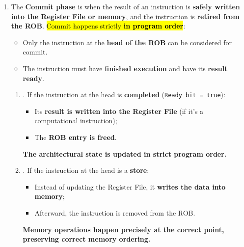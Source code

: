 \begin{enumerate}
    \newpage

    \item {}
    
    The \textbf{Commit phase} is when the result of an instruction is \textbf{safely written into the Register File or memory}, and the instruction is \textbf{retired from the ROB}. \hl{Commit happens strictly \textbf{in program order}}:
    \begin{itemize}[label=\textcolor{Green3}{}]
        \item Only the instruction at the \textbf{head of the ROB} can be considered for commit.
        \item The instruction must have \textbf{finished execution} and have its \textbf{result ready}.
    \end{itemize}
    \begin{enumerate}
        \item {}. If the instruction at the head is \textbf{completed} (\texttt{Ready bit = true}):
        \begin{itemize}
            \item Its \textbf{result is written into the Register File} (if it's a computational instruction);
            \item The \textbf{ROB entry is freed}.
        \end{itemize}
        \textcolor{Green3}{\faIcon{\speedIcon} \textbf{The architectural state is updated in strict program order.}}

        \item {}. If the instruction at the head is a \textbf{store}:
        \begin{itemize}
            \item Instead of updating the Register File, it \textbf{writes the data into memory};
            \item Afterward, the instruction is removed from the ROB.
        \end{itemize}
        \textcolor{Green3}{\faIcon{\speedIcon} \textbf{Memory operations happen precisely at the correct point, preserving correct memory ordering.}}
        

\end{enumerate}
\end{enumerate}
